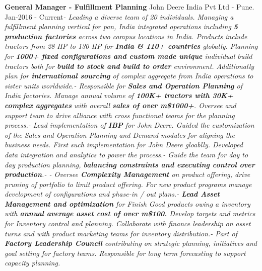 \documentclass[11pt, a4paper]{awesome-cv}
\begin{document}
\textbf{General Manager - Fulfillment Planning} \hfill John Deere India
Pvt Ltd - Pune\newline . \hfill Jan-2016 -
Current\newline \textit{- \hspace{5mm}  Leading a diverse team of 20 individuals. Managing a fulfillment planning vertical for pan, India integrated operations including \textbf{5 production factories} across two campus locations in India. Products include tractors from 28 HP to 130 HP for \textbf{India \& 110+ countries} globally. Planning for \textbf{1000+ fixed configurations and custom made unique} individual build tractors both for \textbf{build to stock and build to order} environment. Additionally plan for \textbf{international sourcing} of complex aggregate from India operations to sister units worldwide.\newline - \hspace{5mm}  Responsible  for \textbf{Sales and Operation Planning} of India factories.  Manage annual volume of \textbf{100K+ tractors with 30K+ complex aggregates} with overall \textbf{sales of over m\$1000+}. Oversee and support team to drive alliance with cross functional teams for the planning process.\newline - \hspace{5mm}  Lead implementation of \textbf{IBP} for John Deere. Guided the customization of  the  Sales and Operation Planning and Demand modules for aligning the business needs. First such implementation for John Deere gloablly. Developed data integration and analytics to power the process.\newline - \hspace{5mm}  Guide the team for day to day production planning,  \textbf{balancing constraints and executing control over production}.\newline - \hspace{5mm}  \newpage - \hspace{5mm} Oversee \textbf{Complexity Management} on product offering, drive pruning of portfolio to limit product offering. For new product programs manage development of configurations and phase-in / out plans.\newline - \hspace{5mm}  \textbf{Lead Asset Management and optimization} for Finish Good products owing a inventory with \textbf{annual average asset cost of over m\$100.}  Develop targets and metrics for Inventory control and planning. Collaborate with finance leadership on asset turns and with product marketing teams for inventory distribution.\newline - \hspace{5mm}  Part of  \textbf{Factory Leadership Council} contributing on strategic planning, initiatives and goal setting for factory teams. Responsible for  long term forecasting to support capacity planning.}
\end{document}

